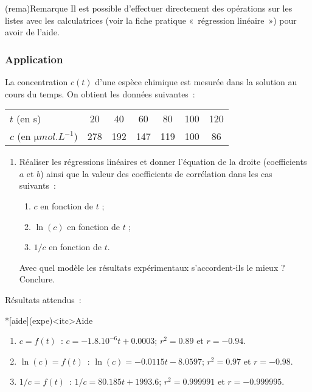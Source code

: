 \documentclass[../main/main.tex]{subfiles}
\begin{document}
\begin{tcb}(rema){Remarque}
	Il est possible d'effectuer directement des opérations sur les listes avec les
	calculatrices (voir la fiche pratique «~régression linéaire~») pour avoir de
	l'aide.
\end{tcb}

\subsubsection{Application}
La concentration $c(t)$ d'une espèce chimique est mesurée dans la solution au
cours du temps. On obtient les données suivantes~:

\begin{center}
	\begin{tabular}{ l  c  c  c  c  c  c }
		\toprule
		$t$ (en s)                        & 20  & 40  & 60  & 80  & 100 & 120 \\
		$c$ (en $\si{\micro mol.L^{-1}}$) & 278 & 192 & 147 & 119 & 100 & 86  \\
		\bottomrule
	\end{tabular}
\end{center}

\begin{enumerate}
	\item Réaliser les régressions linéaires et donner l'équation de la
	      droite (coefficients $a$ et $b$) ainsi que la valeur des coefficients de
	      corrélation dans les cas suivants~:
	      \begin{enumerate}
		      \item $c$ en fonction de $t$ ;
		      \item $\ln(c)$ en fonction de $t$ ;
		      \item $1/c$ en fonction de $t$.
	      \end{enumerate}
	      Avec quel modèle les résultats expérimentaux s'accordent-ils le mieux ?
	      Conclure.
\end{enumerate}

\vfill

Résultats attendus~:

\begin{tcb}*[aide](expe)<itc>{Aide}
	\begin{enumerate}
		\item $c = f(t)$~: $c = -\num{1,8}.10^{-6} t + \num{0,0003}$; $r^2 =
			      \num{0,89}$ et $r = - \num{0,94}$.
		\item $\ln(c) = f(t)$~: $\ln(c) = -\num{0,0115} t - \num{8,0597}$; $r^2 =
			      \num{0,97}$ et $r = - \num{0,98}$.
		\item $1/c = f(t)$~: $1/c = \num{80,185} t + \num{1993,6}$; $r^2 =
			      \num{0,999991}$ et $r = - \num{0,999995}$.
	\end{enumerate}
\end{tcb}
\end{document}
